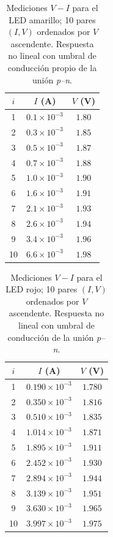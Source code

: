 \documentclass[11pt,twocolumn]{article}
\begin{document}

\begin{table}
\centering
\caption{Mediciones $V\!-\!I$ para el LED amarillo; 10 pares $(I,V)$ ordenados por $V$ ascendente. Respuesta no lineal con umbral de conducción propio de la unión \textit{p–n}.}
\label{tab1:led_amarillo}
\begin{tabular}{|c|c|c|}
\hline
$i$ & $I$ (A) & $V$ (V) \\
\hline
1  & $0.1\times 10^{-3}$ & $1.80$ \\
2  & $0.3\times 10^{-3}$ & $1.85$ \\
3  & $0.5\times 10^{-3}$ & $1.87$ \\
4  & $0.7\times 10^{-3}$ & $1.88$ \\
5  & $1.0\times 10^{-3}$ & $1.90$ \\
6  & $1.6\times 10^{-3}$ & $1.91$ \\
7  & $2.1\times 10^{-3}$ & $1.93$ \\
8  & $2.6\times 10^{-3}$ & $1.94$ \\
9  & $3.4\times 10^{-3}$ & $1.96$ \\
10 & $6.6\times 10^{-3}$ & $1.98$ \\
\hline
\end{tabular}
\end{table}


\begin{table}
\centering
\caption{Mediciones $V\!-\!I$ para el LED rojo; 10 pares $(I,V)$ ordenados por $V$ ascendente. Respuesta no lineal con umbral de conducción de la unión \textit{p–n}.}
\label{tab1:led_rojo}
\begin{tabular}{|c|c|c|}
\hline
$i$ & $I$ (A) & $V$ (V) \\
\hline
1  & $0.190\times 10^{-3}$ & $1.780$ \\
2  & $0.350\times 10^{-3}$ & $1.816$ \\
3  & $0.510\times 10^{-3}$ & $1.835$ \\
4  & $1.014\times 10^{-3}$ & $1.871$ \\
5  & $1.895\times 10^{-3}$ & $1.911$ \\
6  & $2.452\times 10^{-3}$ & $1.930$ \\
7  & $2.894\times 10^{-3}$ & $1.944$ \\
8  & $3.139\times 10^{-3}$ & $1.951$ \\
9  & $3.630\times 10^{-3}$ & $1.965$ \\
10 & $3.997\times 10^{-3}$ & $1.975$ \\
\hline
\end{tabular}
\end{table}
\end{document}
